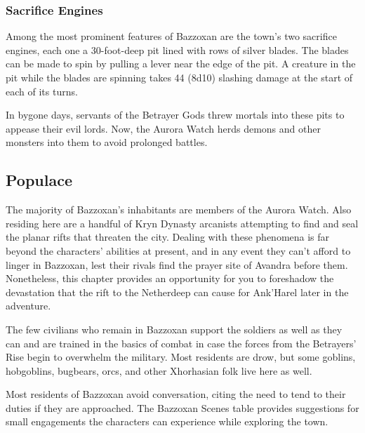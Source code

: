 \documentclass[letterpaper, 11pt, bg=full, twocolumn]{dndbook}
\begin{document}
\subsubsection{Sacrifice Engines}

Among the most prominent features of Bazzoxan are the town's two sacrifice engines, each one a 30-foot-deep pit lined with rows of silver blades. The blades can be made to spin by pulling a lever near the edge of the pit. A creature in the pit while the blades are spinning takes 44 (8d10) slashing damage at the start of each of its turns.

In bygone days, servants of the Betrayer Gods threw mortals into these pits to appease their evil lords. Now, the Aurora Watch herds demons and other monsters into them to avoid prolonged battles.

\subsection{Populace}

The majority of Bazzoxan's inhabitants are members of the Aurora Watch. Also residing here are a handful of Kryn Dynasty arcanists attempting to find and seal the planar rifts that threaten the city. Dealing with these phenomena is far beyond the characters' abilities at present, and in any event they can't afford to linger in Bazzoxan, lest their rivals find the prayer site of Avandra before them. Nonetheless, this chapter provides an opportunity for you to foreshadow the devastation that the rift to the Netherdeep can cause for Ank'Harel later in the adventure.

The few civilians who remain in Bazzoxan support the soldiers as well as they can and are trained in the basics of combat in case the forces from the Betrayers' Rise begin to overwhelm the military. Most residents are drow, but some goblins, hobgoblins, bugbears, orcs, and other Xhorhasian folk live here as well.

Most residents of Bazzoxan avoid conversation, citing the need to tend to their duties if they are approached. The Bazzoxan Scenes table provides suggestions for small engagements the characters can experience while exploring the town.
\end{document}
